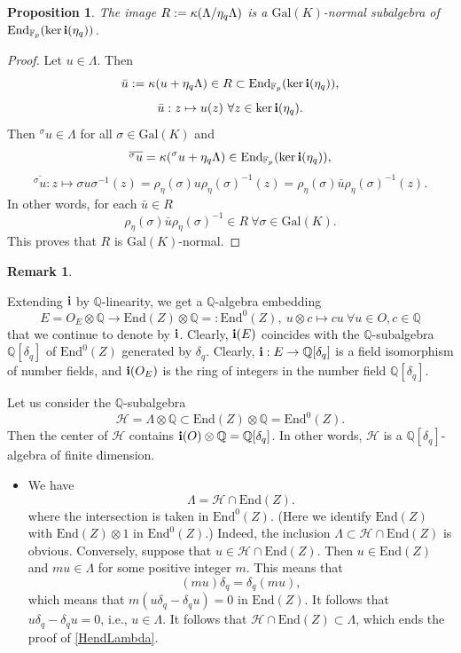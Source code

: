 \documentclass[12pt,a4paper,reqno]{amsart}
\def\Q{{\mathbb Q}}
\def\F{{\mathbb F}}
\def\Gal{\mathrm{Gal}}
\def\End{\mathrm{End}}
\newtheorem{prop}[thm]{Proposition}
\theoremstyle{definition}
\newtheorem{rem}[thm]{Remark}
\begin{document}
\begin{prop}
\label{normalLambdaEta}
The image $R:={\bf \kappa}(\Lambda/\eta_q\Lambda)$ is a $\Gal(K)$-normal subalgebra of $\End_{\F_p}(\ker {\bf i}(\eta_q))$.
\end{prop}

\begin{proof}
\label{RnormalLambda}
Let $u \in \Lambda$. Then
$$\bar{u}: ={\bf \kappa}(u+\eta_q \Lambda)\in R \subset\End_{\F_p}(\ker {\bf i}(\eta_q)),$$
$$  \bar{u}: z \mapsto u(z) \ \forall z \in \ker {\bf i}(\eta_q).$$
Then $^{\sigma}u\in \Lambda$ for all $\sigma \in \Gal(K)$ and
$$\overline{^{\sigma}u}={\bf \kappa}(^{\sigma}u+\eta_q \Lambda)\in \End_{\F_p}(\ker {\bf i}(\eta_q)),$$
$$\overline{^{\sigma}u}: z \mapsto \sigma u \sigma^{-1} (z)=\rho_{\eta}(\sigma) u \rho_{\eta}(\sigma)^{-1}(z)=\rho_{\eta}(\sigma) \bar{u} \rho_{\eta}(\sigma)^{-1}(z).$$
In other words, for each $\bar{u}\in R$
$$\rho_{\eta}(\sigma) \bar{u} \rho_{\eta}(\sigma)^{-1} \in R \ \forall \sigma \in \Gal(K).$$
This proves that $R$ is $\Gal(K)$-normal.
\end{proof}


\begin{rem}
\label{LambdaQ}
\item[(i)]
Extending ${\bf i}$ by $\Q$-linearity, we get a $\Q$-algebra embedding
$$E=O_E\otimes\Q \to \End(Z)\otimes \Q=:\End^0(Z),  \ u\otimes c \mapsto cu \ \forall u \in O, c \in \Q$$
that we continue to denote by ${\bf i}$. Clearly, ${\bf i}(E)$ coincides with the $\Q$-subalgebra $\Q[\delta_q]$ of $\End^0(Z)$ generated by $\delta_q$.
Clearly, ${\bf i}: E \to \Q[\delta_q]$  is a field isomorphism of number fields, and ${\bf i}(O_E)$ is the ring of integers in 
the number  field $\Q[\delta_q]$.
\item[(ii)]
Let us consider the $\Q$-subalgebra
$$\mathcal{H}=\Lambda \otimes \Q\subset \End(Z)\otimes \Q=\End^0(Z).$$
Then the center of $\mathcal{H}$ contains ${\bf i}(O)\otimes \Q=\Q[\delta_q]$. In other words, $\mathcal{H}$ is a $\Q[\delta_q]$-algebra of finite dimension. 
\begin{itemize}
\item[(iii)]
We have
\begin{equation}
\label{HendLambda}
\Lambda=\mathcal{H}\cap \End(Z).
\end{equation}
where the intersection is taken in $\End^0(Z)$.
(Here we identify $\End(Z)$ with $\End(Z)\otimes 1$ in $\End^0(Z)$.)
Indeed, the inclusion $\Lambda\subset\mathcal{H}\cap \End(Z)$ is obvious.
Conversely, suppose that $u \in \mathcal{H}\cap \End(Z)$. Then $u \in \End(Z)$ and
$m u \in \Lambda$ for some positive integer $m$. This means that
$$(mu)\delta_q=\delta_q (mu),$$
which means that $m(u \delta_q-\delta_q u)=0$ in $\End(Z)$. It follows that $u \delta_q-\delta_q u=0$,
i.e., $u \in \Lambda$. It follows that $\mathcal{H}\cap \End(Z)\subset \Lambda$, which ends the proof of \eqref{HendLambda}.


\end{itemize}
\end{rem}
\end{document}
